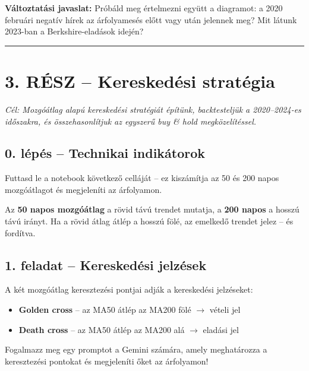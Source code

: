 \documentclass[11pt,a4paper]{article}
\newcommand{\note}[1]{%
  \vspace{3pt}%
  \begin{tcolorbox}[notestyle]%
  \textbf{\textcolor{noteborder}{Változtatási javaslat:}} #1%
  \end{tcolorbox}\vspace{2pt}}
\newcommand{\lbl}[1]{\vspace{6pt}\noindent{\small\bfseries\textcolor{labelcolor}{#1}}\par\smallskip}
\begin{document}
\note{Próbáld meg értelmezni együtt a diagramot: a 2020 februári
negatív hírek az árfolyamesés előtt vagy után jelennek meg?
Mit látunk 2023-ban a Berkshire-eladások idején?}

\bigskip\noindent\rule{\linewidth}{0.4pt}\bigskip

\section{3. RÉSZ -- Kereskedési stratégia}

\noindent\textit{Cél: Mozgóátlag alapú kereskedési stratégiát építünk,
backtesteljük a 2020--2024-es időszakra, és összehasonlítjuk
az egyszerű buy \& hold megközelítéssel.}

\bigskip

\subsection{0. lépés -- Technikai indikátorok}

\noindent Futtasd le a notebook következő celláját -- ez kiszámítja
az 50 és 200 napos mozgóátlagot és megjeleníti az árfolyamon.

\medskip
\noindent Az \textbf{50 napos mozgóátlag} a rövid távú trendet mutatja,
a \textbf{200 napos} a hosszú távú irányt. Ha a rövid átlag átlép
a hosszú fölé, az emelkedő trendet jelez -- és fordítva.

\bigskip

\subsection{1. feladat -- Kereskedési jelzések}

\noindent A két mozgóátlag keresztezési pontjai adják a kereskedési jelzéseket:

\begin{itemize}[noitemsep, topsep=4pt]
  \item \textbf{Golden cross} -- az MA50 átlép az MA200 fölé $\rightarrow$ vételi jel
  \item \textbf{Death cross} -- az MA50 átlép az MA200 alá $\rightarrow$ eladási jel
\end{itemize}

\bigskip

\lbl{Feladat:}
Fogalmazz meg egy promptot a Gemini számára, amely meghatározza
a keresztezési pontokat és megjeleníti őket az árfolyamon!
\end{document}
